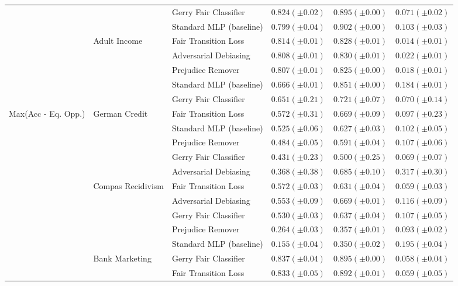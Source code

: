 \begin{tabular}{llllll}
 &  & Gerry Fair Classifier & $0.824 (\pm0.02)$ & $0.895 (\pm0.00)$ & $0.071 (\pm0.02)$ \\
 &  & Standard MLP (baseline) & $0.799 (\pm0.04)$ & $0.902 (\pm0.00)$ & $0.103 (\pm0.03)$ \\
\cline{2-6}
 & \multirow[t]{5}{*}{Adult Income} & Fair Transition Loss & $0.814 (\pm0.01)$ & $0.828 (\pm0.01)$ & $0.014 (\pm0.01)$ \\
 &  & Adversarial Debiasing & $0.808 (\pm0.01)$ & $0.830 (\pm0.01)$ & $0.022 (\pm0.01)$ \\
 &  & Prejudice Remover & $0.807 (\pm0.01)$ & $0.825 (\pm0.00)$ & $0.018 (\pm0.01)$ \\
 &  & Standard MLP (baseline) & $0.666 (\pm0.01)$ & $0.851 (\pm0.00)$ & $0.184 (\pm0.01)$ \\
 &  & Gerry Fair Classifier & $0.651 (\pm0.21)$ & $0.721 (\pm0.07)$ & $0.070 (\pm0.14)$ \\
\cline{1-6} \cline{2-6}
\multirow[t]{20}{*}{Max(Acc - Eq. Opp.)} & \multirow[t]{5}{*}{German Credit} & Fair Transition Loss & $0.572 (\pm0.31)$ & $0.669 (\pm0.09)$ & $0.097 (\pm0.23)$ \\
 &  & Standard MLP (baseline) & $0.525 (\pm0.06)$ & $0.627 (\pm0.03)$ & $0.102 (\pm0.05)$ \\
 &  & Prejudice Remover & $0.484 (\pm0.05)$ & $0.591 (\pm0.04)$ & $0.107 (\pm0.06)$ \\
 &  & Gerry Fair Classifier & $0.431 (\pm0.23)$ & $0.500 (\pm0.25)$ & $0.069 (\pm0.07)$ \\
 &  & Adversarial Debiasing & $0.368 (\pm0.38)$ & $0.685 (\pm0.10)$ & $0.317 (\pm0.30)$ \\
\cline{2-6}
 & \multirow[t]{5}{*}{Compas Recidivism} & Fair Transition Loss & $0.572 (\pm0.03)$ & $0.631 (\pm0.04)$ & $0.059 (\pm0.03)$ \\
 &  & Adversarial Debiasing & $0.553 (\pm0.09)$ & $0.669 (\pm0.01)$ & $0.116 (\pm0.09)$ \\
 &  & Gerry Fair Classifier & $0.530 (\pm0.03)$ & $0.637 (\pm0.04)$ & $0.107 (\pm0.05)$ \\
 &  & Prejudice Remover & $0.264 (\pm0.03)$ & $0.357 (\pm0.01)$ & $0.093 (\pm0.02)$ \\
 &  & Standard MLP (baseline) & $0.155 (\pm0.04)$ & $0.350 (\pm0.02)$ & $0.195 (\pm0.04)$ \\
\cline{2-6}
 & \multirow[t]{5}{*}{Bank Marketing} & Gerry Fair Classifier & $0.837 (\pm0.04)$ & $0.895 (\pm0.00)$ & $0.058 (\pm0.04)$ \\
 &  & Fair Transition Loss & $0.833 (\pm0.05)$ & $0.892 (\pm0.01)$ & $0.059 (\pm0.05)$ \\

\end{tabular}

